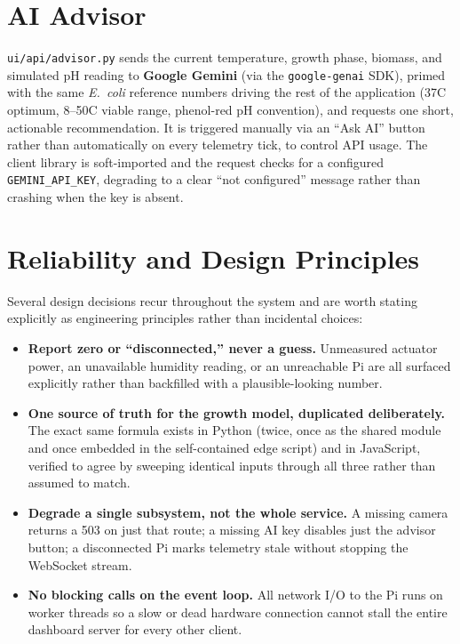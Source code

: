 \documentclass[11pt]{article}
\begin{document}
\section{AI Advisor}

\texttt{ui/api/advisor.py} sends the current temperature, growth phase, biomass, and simulated pH reading to \textbf{Google Gemini} (via the \texttt{google-genai} SDK), primed with the same \emph{E.~coli} reference numbers driving the rest of the application (37\textdegree{}C optimum, 8--50\textdegree{}C viable range, phenol-red pH convention), and requests one short, actionable recommendation. It is triggered manually via an ``Ask AI'' button rather than automatically on every telemetry tick, to control API usage. The client library is soft-imported and the request checks for a configured \texttt{GEMINI\_API\_KEY}, degrading to a clear ``not configured'' message rather than crashing when the key is absent.

\section{Reliability and Design Principles}

Several design decisions recur throughout the system and are worth stating explicitly as engineering principles rather than incidental choices:

\begin{itemize}
    \item \textbf{Report zero or ``disconnected,'' never a guess.} Unmeasured actuator power, an unavailable humidity reading, or an unreachable Pi are all surfaced explicitly rather than backfilled with a plausible-looking number.
    \item \textbf{One source of truth for the growth model, duplicated deliberately.} The exact same formula exists in Python (twice, once as the shared module and once embedded in the self-contained edge script) and in JavaScript, verified to agree by sweeping identical inputs through all three rather than assumed to match.
    \item \textbf{Degrade a single subsystem, not the whole service.} A missing camera returns a 503 on just that route; a missing AI key disables just the advisor button; a disconnected Pi marks telemetry stale without stopping the WebSocket stream.
    \item \textbf{No blocking calls on the event loop.} All network I/O to the Pi runs on worker threads so a slow or dead hardware connection cannot stall the entire dashboard server for every other client.
\end{itemize}
\end{document}

